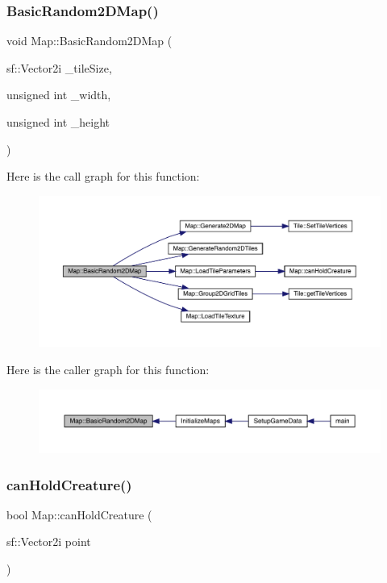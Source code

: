 \subsubsection{\texorpdfstring{Basic\+Random2\+D\+Map()}{BasicRandom2DMap()}}
{\footnotesize\ttfamily void Map\+::\+Basic\+Random2\+D\+Map (\begin{DoxyParamCaption}\item[{sf\+::\+Vector2i}]{\+\_\+tile\+Size,  }\item[{unsigned int}]{\+\_\+width,  }\item[{unsigned int}]{\+\_\+height }\end{DoxyParamCaption})}

Here is the call graph for this function\+:
\nopagebreak
\begin{figure}[H]
\begin{center}
\leavevmode
\includegraphics[width=350pt]{class_map_a1fabae1bed7d63177af112101c38c3b5_cgraph}
\end{center}
\end{figure}
Here is the caller graph for this function\+:
\nopagebreak
\begin{figure}[H]
\begin{center}
\leavevmode
\includegraphics[width=350pt]{class_map_a1fabae1bed7d63177af112101c38c3b5_icgraph}
\end{center}
\end{figure}
\mbox{\label{class_map_a2ee6fd8a412c966c941784b226374bd1}} 
\subsubsection{\texorpdfstring{can\+Hold\+Creature()}{canHoldCreature()}}
{\footnotesize\ttfamily bool Map\+::can\+Hold\+Creature (\begin{DoxyParamCaption}\item[{sf\+::\+Vector2i}]{point }\end{DoxyParamCaption})}

